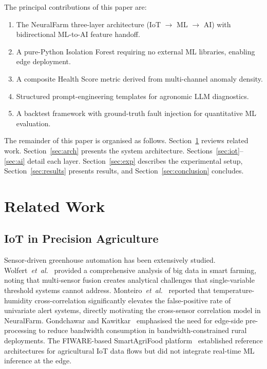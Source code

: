 \documentclass[journal,10pt,twocolumn]{IEEEtran}
\begin{document}
The principal contributions of this paper are:
\begin{enumerate}
  \item The NeuralFarm three-layer architecture
        (IoT $\to$ ML $\to$ AI) with bidirectional ML-to-AI
        feature handoff.
  \item A pure-Python Isolation Forest requiring no external ML
        libraries, enabling edge deployment.
  \item A composite Health Score metric derived from multi-channel
        anomaly density.
  \item Structured prompt-engineering templates for agronomic LLM
        diagnostics.
  \item A backtest framework with ground-truth fault injection for
        quantitative ML evaluation.
\end{enumerate}

The remainder of this paper is organised as follows.
Section~\ref{sec:related} reviews related work.
Section~\ref{sec:arch} presents the system architecture.
Sections~\ref{sec:iot}--\ref{sec:ai} detail each layer.
Section~\ref{sec:exp} describes the experimental setup,
Section~\ref{sec:results} presents results, and
Section~\ref{sec:conclusion} concludes.

\section{Related Work}
\label{sec:related}

\subsection{IoT in Precision Agriculture}

Sensor-driven greenhouse automation has been extensively studied.
Wolfert~\textit{et~al.}~\cite{Wolfert2017} provided a comprehensive
analysis of big data in smart farming, noting that multi-sensor fusion
creates analytical challenges that single-variable threshold systems
cannot address.
Monteiro~\textit{et~al.}~\cite{Monteiro2018} reported that
temperature-humidity cross-correlation significantly elevates the
false-positive rate of univariate alert systems, directly motivating
the cross-sensor correlation model in NeuralFarm.
Gondchawar and Kawitkar~\cite{Gondchawar2016} emphasised the need for
edge-side pre-processing to reduce bandwidth consumption in
bandwidth-constrained rural deployments.
The FIWARE-based SmartAgriFood platform~\cite{Gyrard2018} established
reference architectures for agricultural IoT data flows but did not
integrate real-time ML inference at the edge.
\end{document}

